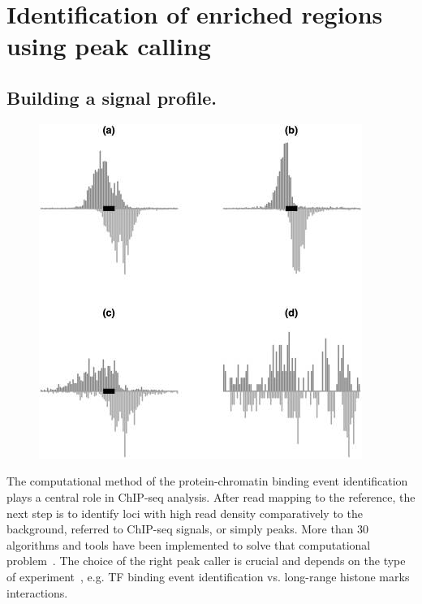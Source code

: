 \chapter{Identification of enriched regions using peak calling}

\section{Building a signal profile.}

\begin{figure}[b!]
    \centering
    \includegraphics[width=\textwidth]{../img/peaks.jpg}
    \label{fig:graph_classes}
\end{figure}

The computational method of the protein-chromatin binding event identification plays a central role in ChIP-seq analysis. 
After read mapping to the reference, the next step is to identify loci with high read density comparatively to the background, referred to ChIP-seq signals, or simply peaks.
More than 30 algorithms and tools have been implemented to solve that computational problem~\cite{chen2012systematic}.
The choice of the right peak caller is crucial and depends on the type of experiment~\cite{nakato2017recent}, e.g. TF binding event identification vs. long-range histone marks interactions.



